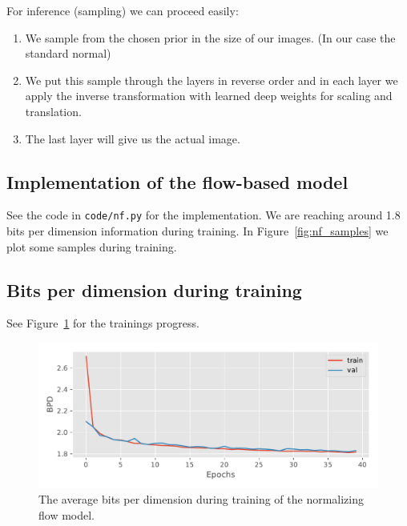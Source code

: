 \documentclass{article}
\begin{document}
For inference (sampling) we can proceed easily:
\begin{enumerate}
  \item We sample from the chosen prior in the size of our images. (In our case the standard normal)
  \item We put this sample through the layers in reverse order and in each layer we apply the inverse transformation with learned deep weights for scaling and translation.
  \item The last layer will give us the actual image.
\end{enumerate}

\subsection{Implementation of the flow-based model}
See the code in \texttt{code/nf.py} for the implementation.
We are reaching around 1.8 bits per dimension information during training.
In Figure~\ref{fig:nf_samples} we plot some samples during training.

\subsection{Bits per dimension during training}
See Figure~\ref{fig:nf} for the trainings progress.
\begin{figure}
  \centering
  \includegraphics[width=0.7\linewidth]{assignment_3/code/figures/nf.pdf}
  \caption{The average bits per dimension during training of the normalizing flow model.}
  \label{fig:nf}
\end{figure}
\end{document}
